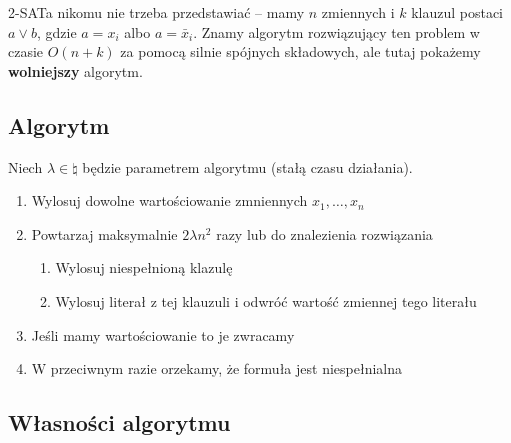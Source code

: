 
2-SATa nikomu nie trzeba przedstawiać -- mamy \( n \) zmiennych i \( k \) klauzul postaci \( a \lor b \), gdzie \( a = x_i \) albo \( a = \bar x_i \).
Znamy algorytm rozwiązujący ten problem w czasie \( O(n + k) \) za pomocą silnie spójnych składowych, ale tutaj pokażemy \textbf{wolniejszy} algorytm.

\subsection{Algorytm}
\label{2-sat-algorithm}
Niech \( \lambda \in \natural \) będzie parametrem algorytmu (stałą czasu działania).
\begin{enumerate}
    \item Wylosuj dowolne wartościowanie zmniennych \( x_1, \dots, x_n \)
    \item Powtarzaj maksymalnie \( 2\lambda n^2 \) razy lub do znalezienia rozwiązania
    \begin{enumerate}
        \item Wylosuj niespełnioną klazulę
        \item Wylosuj literał z tej klauzuli i odwróć wartość zmiennej tego literału
    \end{enumerate}
    \item Jeśli mamy wartościowanie to je zwracamy
    \item W przeciwnym razie orzekamy, że formuła jest niespełnialna
\end{enumerate}

\subsection{Własności algorytmu}

